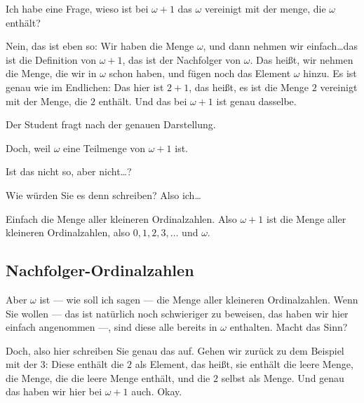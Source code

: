 \begin{student-interaction}[Studentenfrage]
Ich habe eine Frage, wieso ist bei $\omega + 1$ das $\omega$ vereinigt mit der menge, die $\omega$ enthält?
\end{student-interaction}

\begin{spoken-clean}[00:15:45 - 00:16:10]
Nein, das ist eben so: Wir haben die Menge $\omega$, und dann nehmen wir einfach\dots das ist die Definition von $\omega + 1$, das ist der Nachfolger von $\omega$. Das heißt, wir nehmen die Menge, die wir in $\omega$ schon haben, und fügen noch das Element $\omega$ hinzu. Es ist genau wie im Endlichen: Das hier ist $2 + 1$, das heißt, es ist die Menge $2$ vereinigt mit der Menge, die $2$ enthält. Und das bei $\omega + 1$ ist genau dasselbe.
\end{spoken-clean}

\begin{student-interaction}[Studentenfrage]
Der Student fragt nach der genauen Darstellung.
\end{student-interaction}

\begin{spoken-clean}[00:16:10 - 00:16:18]
Doch, weil $\omega$ eine Teilmenge von $\omega + 1$ ist.
\end{spoken-clean}

\begin{student-interaction}[Studentenfrage]
Ist das nicht so, aber nicht\dots?
\end{student-interaction}

\begin{spoken-clean}[00:16:18 - 00:16:22]
Wie würden Sie es denn schreiben? Also ich\dots
\end{spoken-clean}

\begin{student-interaction}[Studentenvorschlag]
Einfach die Menge aller kleineren Ordinalzahlen. Also $\omega + 1$ ist die Menge aller kleineren Ordinalzahlen, also $0, 1, 2, 3, \dots$ und $\omega$.
\end{student-interaction}

\subsection{Nachfolger-Ordinalzahlen}
\begin{spoken-clean}[00:16:22 - 00:17:11]
Aber $\omega$ ist --- wie soll ich sagen --- die Menge aller kleineren Ordinalzahlen. Wenn Sie wollen --- das ist natürlich noch schwieriger zu beweisen, das haben wir hier einfach angenommen ---, sind diese alle bereits in $\omega$ enthalten. Macht das Sinn?

Doch, also hier schreiben Sie genau das auf. Gehen wir zurück zu dem Beispiel mit der $3$: Diese enthält die $2$ als Element, das heißt, sie enthält die leere Menge, die Menge, die die leere Menge enthält, und die $2$ selbst als Menge. Und genau das haben wir hier bei $\omega + 1$ auch. Okay.
\end{spoken-clean}


